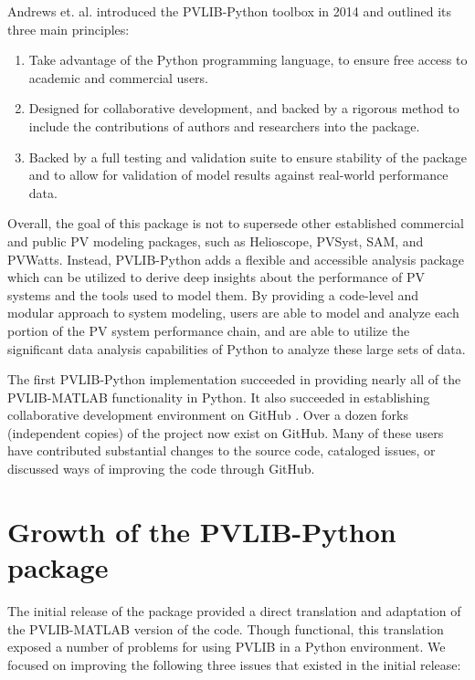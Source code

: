 \documentclass[conference]{IEEEtran}
\begin{document}
Andrews et. al. \cite{andrews} introduced the PVLIB-Python toolbox in 2014 and outlined its three main principles:

\begin{enumerate}
\item Take advantage of the Python programming language, to ensure free access to academic and commercial users.
\item Designed for collaborative development, and backed by a rigorous method to include the contributions of authors and researchers into the package.
\item Backed by a full testing and validation suite to ensure stability of the package and to allow for validation of model results against real-world performance data.
\end{enumerate}

Overall, the goal of this package is not to supersede other established commercial and public PV modeling packages, such as Helioscope, PVSyst, SAM, and PVWatts. 
Instead, PVLIB-Python adds a flexible and accessible analysis package which can be utilized to derive deep insights about the performance of PV systems and the tools used to model them.
By providing a code-level and modular approach to system modeling, users are able to model and analyze each portion of the PV system performance chain, and are able to utilize the significant data analysis capabilities of Python to analyze these large sets of data. 

The first PVLIB-Python implementation succeeded in providing nearly all of the PVLIB-MATLAB functionality in Python.
It also succeeded in establishing collaborative development environment on GitHub \cite{pvlib-github}. 
Over a dozen forks (independent copies) of the project now exist on GitHub. 
Many of these users have contributed substantial changes to the source code, cataloged issues, or discussed ways of improving the code through GitHub.


\section{Growth of the PVLIB-Python package}

The initial release of the package provided a direct translation and adaptation of the PVLIB-MATLAB version of the code.
Though functional, this translation exposed a number of problems for using PVLIB in a Python environment.
We focused on improving the following three issues that existed in the initial release:
\end{document}
